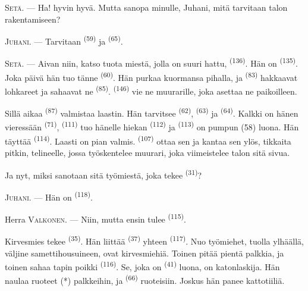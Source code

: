 \textsc{Setä}. --- Ha! hyvin hyvä. Mutta sanopa minulle, Juhani, mitä tarvitaan
talon rakentamiseen?

\textsc{Juhani}. --- Tarvitaan  \textsuperscript{(59)} ja
 \textsuperscript{(65)}.

\textsc{Setä}. --- Aivan niin, katso tuota miestä, jolla on suuri hattu,
 \textsuperscript{(136)}. Hän on 
\textsuperscript{(135)}. Joka päivä hän tuo tänne 
\textsuperscript{(60)}. Hän purkaa kuormansa pihalla, ja 
\textsuperscript{(83)} hakkaavat lohkareet ja sahaavat ne
 \textsuperscript{(85)}. 
\textsuperscript{(146)} vie ne muurarille, joka asettaa ne paikoilleen.

Sillä aikaa  \textsuperscript{(87)} valmistaa laastin.
Hän tarvitsee  \textsuperscript{(62)}, 
\textsuperscript{(63)} ja  \textsuperscript{(64)}. Kalkki on hänen
vieressään  \textsuperscript{(71)}, 
\textsuperscript{(111)} tuo hänelle hiekan 
\textsuperscript{(112)} ja  \textsuperscript{(113)} on pumpun
(58) luona. Hän täyttää  \textsuperscript{(114)}. Laasti on pian
valmis.  \textsuperscript{(107)} ottaa sen ja kantaa sen
ylös, tikkaita pitkin, telineelle, jossa työskentelee muurari, joka viimeistelee
talon sitä sivua.

Ja nyt, miksi sanotaan sitä työmiestä, joka tekee 
\textsuperscript{(31)}?

\textsc{Juhani}. --- Hän on  \textsuperscript{(118)}.

\VUsaut{3.0mm}
\VUsaut{3.0mm}

Herra \textsc{Valkonen}. --- Niin, mutta ensin tulee 
\textsuperscript{(115)}.

Kirvesmies tekee  \textsuperscript{(35)}. Hän liittää
 \textsuperscript{(37)} yhteen 
\textsuperscript{(117)}. Nuo työmiehet, tuolla ylhäällä, väljine
samettihousuineen, ovat kirvesmiehiä. Toinen pitää pientä palkkia, ja toinen
sahaa tapin poikki  \textsuperscript{(116)}. Se, joka on
 \textsuperscript{(41)} luona, on katonlaskija. Hän naulaa
ruoteet (*) palkkeihin, ja  \textsuperscript{(66)}
ruoteisiin. Joskus hän panee kattotiiliä.


